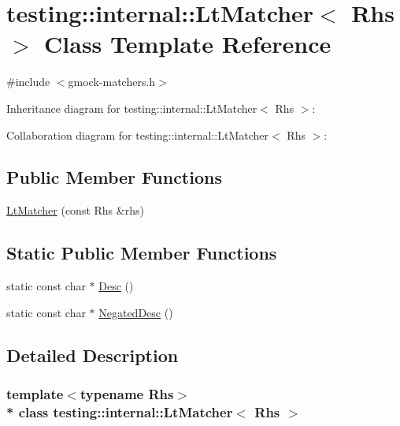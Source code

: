 \hypertarget{classtesting_1_1internal_1_1_lt_matcher}{}\section{testing\+:\+:internal\+:\+:Lt\+Matcher$<$ Rhs $>$ Class Template Reference}
\label{classtesting_1_1internal_1_1_lt_matcher}


{\ttfamily \#include $<$gmock-\/matchers.\+h$>$}



Inheritance diagram for testing\+:\+:internal\+:\+:Lt\+Matcher$<$ Rhs $>$\+:


Collaboration diagram for testing\+:\+:internal\+:\+:Lt\+Matcher$<$ Rhs $>$\+:
\subsection*{Public Member Functions}
\begin{DoxyCompactItemize}
\item 
\hyperlink{classtesting_1_1internal_1_1_lt_matcher_af5275d78fc5499e4757f1b3ecca67e15}{Lt\+Matcher} (const Rhs \&rhs)
\end{DoxyCompactItemize}
\subsection*{Static Public Member Functions}
\begin{DoxyCompactItemize}
\item 
static const char $\ast$ \hyperlink{classtesting_1_1internal_1_1_lt_matcher_aeb101aafbf1c074ccbb3df1496487746}{Desc} ()
\item 
static const char $\ast$ \hyperlink{classtesting_1_1internal_1_1_lt_matcher_ab62db503e9e0293b4a2d22a96c140b10}{Negated\+Desc} ()
\end{DoxyCompactItemize}


\subsection{Detailed Description}
\subsubsection*{template$<$typename Rhs$>$\\*
class testing\+::internal\+::\+Lt\+Matcher$<$ Rhs $>$}



